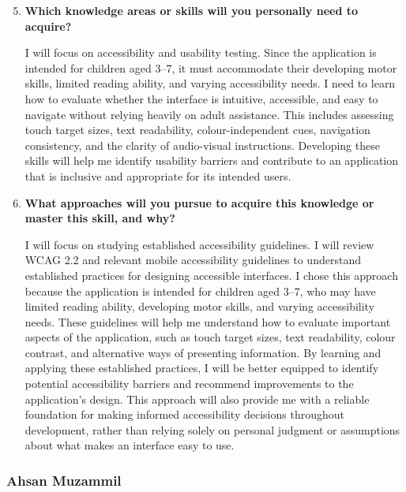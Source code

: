 \documentclass[12pt]{article}
\begin{document}
\begin{enumerate}
    \setcounter{enumi}{4}

    \item \textbf{Which knowledge areas or skills will you personally
    need to acquire?}

    I will focus on accessibility and usability testing. Since the
    application is intended for children aged 3--7, it must accommodate
    their developing motor skills, limited reading ability, and varying
    accessibility needs. I need to learn how to evaluate whether the
    interface is intuitive, accessible, and easy to navigate without
    relying heavily on adult assistance. This includes assessing
    touch target sizes, text readability, colour-independent cues,
    navigation consistency, and the clarity of audio-visual instructions.
    Developing these skills will help me identify usability barriers
    and contribute to an application that is inclusive and appropriate
    for its intended users.

    \item \textbf{What approaches will you pursue to acquire this
    knowledge or master this skill, and why?}

    I will focus on studying established accessibility guidelines.
    I will review WCAG 2.2 and relevant mobile accessibility guidelines
    to understand established practices for designing accessible interfaces.
    I chose this approach because the application is intended for children
    aged 3–7, who may have limited reading ability, developing motor skills,
    and varying accessibility needs. These guidelines will help me understand
    how to evaluate important aspects of the application, such as touch
    target sizes, text readability, colour contrast, and alternative ways
    of presenting information. By learning and applying these established
    practices, I will be better equipped to identify potential accessibility
    barriers and recommend improvements to the application's design.
    This approach will also provide me with a reliable foundation for
    making informed accessibility decisions throughout development,
    rather than relying solely on personal judgment or assumptions about
    what makes an interface easy to use.

\end{enumerate}

\subsubsection*{Ahsan Muzammil}
\end{document}
